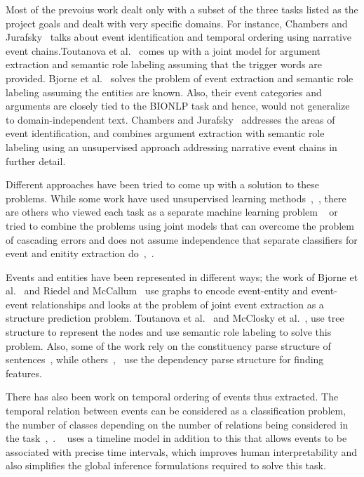 Most of the prevoius work dealt only with a subset of the three tasks listed as the project goals and dealt with very specific domains.  For instance, Chambers and Jurafsky~ talks about event identification and temporal ordering using narrative event chains.Toutanova et al.~ comes up with a joint model for argument extraction and semantic role labeling assuming that the trigger words are provided. Bjorne et al.~ solves the problem of event extraction and semantic role labeling assuming the entities are known. Also, their event categories and arguments are closely tied to the BIONLP task and hence, would not generalize to domain-independent text. Chambers and Jurafsky~ addresses the areas of event identification, and combines argument extraction with semantic role labeling using an unsupervised approach addressing narrative event chains in further detail. 

Different approaches have been tried to come up with a solution to these problems. While some work have used unsupervised learning methods~\cite{chju2008},~\cite{chju2009}, there are others who viewed each task as a separate machine learning problem ~\cite{bjorne} or tried to combine the problems using joint models that can overcome the problem of cascading errors and does not assume independence that separate classifiers for event and enitity extraction do~\cite{toutanova},~\cite{riedelmc}.

Events and entities have been represented in different ways; the work of Bjorne et al.~ and Riedel and McCallum~ use graphs to encode event-entity and event-event relationships and looks at the problem of joint event extraction as a structure prediction problem. Toutanova et al.~ and McClosky et al.~, use tree structure to represent the nodes and use semantic role labeling to solve this problem. Also, some of the work rely on the constituency parse structure of sentences~\cite{toutanova}, while others~\cite{bjorne},~\cite{mcclosky} use the dependency parse structure for finding features. 

There has also been work on temporal ordering of events thus extracted. The temporal relation between events can be considered as a classification problem, the number of classes depending on the number of relations being considered in the task~,~. ~\cite{mcclosky} uses a timeline model in addition to this that allows events to be associated with precise time intervals, which improves human interpretability and also simplifies the global inference formulations required to solve this task.	